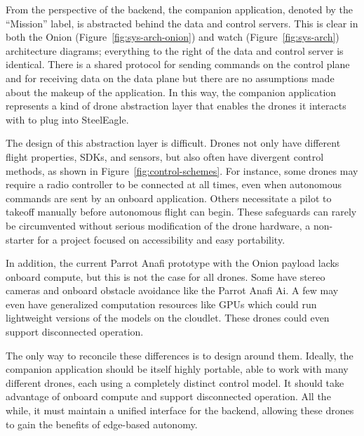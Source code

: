 From the perspective of the backend, the companion application, denoted by the ``Mission'' label, is abstracted behind the data and control servers. This is clear in both the Onion (Figure~\ref{fig:sys-arch-onion}) and watch (Figure~\ref{fig:sys-arch}) architecture diagrams; everything to the right of the data and control server is identical. There is a shared protocol for sending commands on the control plane and for receiving data on the data plane but there are no assumptions made about the makeup of the application. In this way, the companion application represents a kind of drone abstraction layer that enables the drones it interacts with to plug into SteelEagle.

The design of this abstraction layer is difficult. Drones not only have different flight properties, SDKs, and sensors, but also often have divergent control methods, as shown in Figure~\ref{fig:control-schemes}. For instance, some drones may require a radio controller to be connected at all times, even when autonomous commands are sent by an onboard application. Others necessitate a pilot to takeoff manually before autonomous flight can begin. These safeguards can rarely be circumvented without serious modification of the drone hardware, a non-starter for a project focused on accessibility and easy portability.

In addition, the current Parrot Anafi prototype with the Onion payload lacks onboard compute, but this is not the case for all drones. Some have stereo cameras and onboard obstacle avoidance like the Parrot Anafi Ai. A few may even have generalized computation resources like GPUs which could run lightweight versions of the models on the cloudlet. These drones could even support disconnected operation.

The only way to reconcile these differences is to design around them. Ideally, the companion application should be itself highly portable, able to work with many different drones, each using a completely distinct control model. It should take advantage of onboard compute and support disconnected operation. All the while, it must maintain a unified interface for the backend, allowing these drones to gain the benefits of edge-based autonomy.

